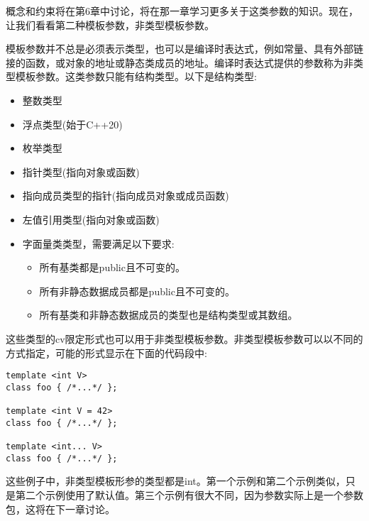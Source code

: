 概念和约束将在第6章中讨论，将在那一章学习更多关于这类参数的知识。现在，让我们看看第二种模板参数，非类型模板参数。



模板参数并不总是必须表示类型，也可以是编译时表达式，例如常量、具有外部链接的函数，或对象的地址或静态类成员的地址。编译时表达式提供的参数称为非类型模板参数。这类参数只能有结构类型。以下是结构类型:

\begin{itemize}
\item 
整数类型

\item 
浮点类型(始于C++20)

\item 
枚举类型

\item 
指针类型(指向对象或函数)

\item 
指向成员类型的指针(指向成员对象或成员函数)

\item 
左值引用类型(指向对象或函数)

\item 
字面量类类型，需要满足以下要求:
\begin{itemize}
\item 
所有基类都是public且不可变的。

\item 
所有非静态数据成员都是public且不可变的。

\item 
所有基类和非静态数据成员的类型也是结构类型或其数组。
\end{itemize}
\end{itemize}

这些类型的cv限定形式也可以用于非类型模板参数。非类型模板参数可以以不同的方式指定，可能的形式显示在下面的代码段中:

\begin{lstlisting}[style=styleCXX]
template <int V>
class foo { /*...*/ };

template <int V = 42>
class foo { /*...*/ };

template <int... V>
class foo { /*...*/ };
\end{lstlisting}

这些例子中，非类型模板形参的类型都是int。第一个示例和第二个示例类似，只是第二个示例使用了默认值。第三个示例有很大不同，因为参数实际上是一个参数包，这将在下一章讨论。

